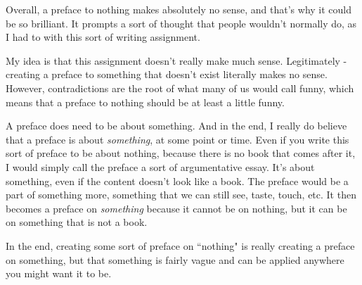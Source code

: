 \documentclass[12pt]{article}
\begin{document}
  Overall, a preface to nothing makes absolutely no sense, and that's why it could be so brilliant.
  It prompts a sort of thought that people wouldn't normally do, as I had to with this sort of writing
  assignment. 

  \clearpage

  My idea is that this assignment doesn't really make much sense. Legitimately - creating a preface
  to something that doesn't exist literally makes no sense. However, contradictions are the root of what
  many of us would call funny, which means that a preface to nothing should be at least a little funny.

  A preface does need to be about something. And in the end, I really do believe that
  a preface is about \textit{something}, at some point or time. Even if you write this sort of preface to 
  be about nothing, because there is no book that comes after it, I would simply call the preface a sort of
  argumentative essay. It's about something, even if the content doesn't look like a book. The preface
  would be a part of something more, something that we can still see, taste, touch, etc. It then becomes
  a preface on \textit{something} because it cannot be on nothing, but it can be on something that is not a 
  book.

  In the end, creating some sort of preface on ``nothing" is really creating a preface on something, but that
  something is fairly vague and can be applied anywhere you might want it to be.
\end{document}
